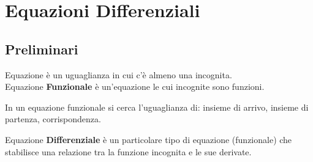 \chapter{Equazioni Differenziali}
\section{Preliminari}
Equazione è un uguaglianza in cui c'è almeno una incognita.\\
Equazione \textbf{Funzionale} è un’equazione le cui incognite sono funzioni.
\begin{note}
	In un equazione funzionale si cerca l'uguaglianza di: insieme di arrivo, insieme di partenza, corrispondenza.
\end{note}
Equazione \textbf{Differenziale} è un particolare tipo di equazione (funzionale) che stabilisce una relazione tra la funzione incognita e le sue derivate.

